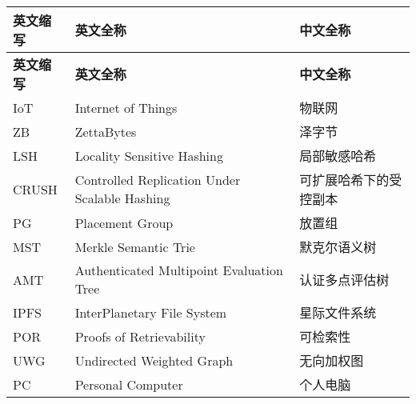 \cleardoublepage
{}
\begin{center}
    \begin{longtable}{m{2cm}m{8cm}m{5cm}}
        \toprule
        \textbf{英文缩写}&\textbf{英文全称}&\textbf{中文全称}\\
        \midrule
        \endfirsthead
        \toprule
        \textbf{英文缩写}&\textbf{英文全称}&\textbf{中文全称}\\
        \midrule
        \endhead 
        \bottomrule
        \endfoot
        \bottomrule
        \endlastfoot
        IoT&Internet of Things&物联网\\
        ZB&ZettaBytes&泽字节\\
        LSH&Locality Sensitive Hashing&局部敏感哈希\\
        CRUSH&Controlled Replication Under Scalable Hashing&可扩展哈希下的受控副本\\
        PG&Placement Group&放置组\\
        MST&Merkle Semantic Trie&默克尔语义树\\
        AMT&Authenticated Multipoint Evaluation Tree&认证多点评估树\\
        IPFS&InterPlanetary File System&星际文件系统\\
        POR&Proofs of Retrievability&可检索性\\
        UWG&Undirected Weighted Graph&无向加权图\\
        PC&Personal Computer&个人电脑\\
	\end{longtable}
\end{center}